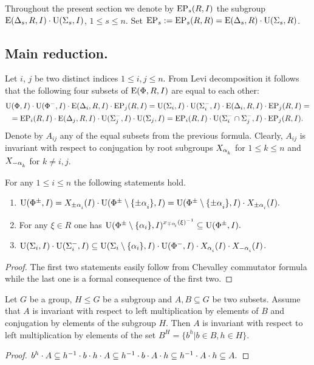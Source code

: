 Throughout the present section we denote by $\operatorname{EP}_s(R, I)$ the subgroup $\operatorname{E}(\Delta_s, R, I) \cdot \operatorname{U}(\Sigma_s, I)$, $1 \leq s \leq n$.
Set $\operatorname{EP}_s := \operatorname{EP}_s(R, R) = \operatorname{E}(\Delta_s, R) \cdot \operatorname{U}(\Sigma_s, R)$. 

\subsection{Main reduction.}
Let $i$, $j$ be two distinct indices $1\leq i,j \leq n$. From Levi decomposition it follows that the following four subsets of $\operatorname{E}(\Phi, R, I)$ are equal to each other:
\begin{multline}\nonumber \operatorname{U}(\Phi, I)\cdot \operatorname{U}(\Phi^-, I) \cdot \operatorname{E}(\Delta_i, R, I) \cdot \operatorname{EP}_j(R, I) = \operatorname{U}(\Sigma_i, I)\cdot \operatorname{U}(\Sigma^-_i, I) \cdot \operatorname{E}(\Delta_i, R, I) \cdot \operatorname{EP}_j(R, I) = \\
= \operatorname{EP}_i(R, I) \cdot \operatorname{E}(\Delta_j, R, I) \cdot \operatorname{U}(\Sigma_j^-, I)\cdot \operatorname{U}(\Sigma_j, I) = \operatorname{EP}_i(R, I) \cdot \operatorname{U}(\Sigma^-_i\cap \Sigma^-_j, I) \cdot \operatorname{EP}_j(R, I). \end{multline}
Denote by $A_{ij}$ any of the equal subsets from the previous formula. 
Clearly, $A_{ij}$ is invariant with respect to conjugation by root subgroups $X_{\alpha\ssub{k}}$ for $1\leq k\leq n$ and $X_{-\alpha\ssub{k}}$ for $k\neq i,j$.

\begin{lemma}\label{lemma:dv_unipotent} For any $1\leq i\leq n$ the following statements hold. \begin{enumerate} 
\item $\U(\Phi^\pm, I) = X_{\pm\alpha\ssub{i}}(I)\cdot \U(\Phi^\pm\setminus\{\pm\alpha\ssub{i}\}, I) = \U(\Phi^\pm\setminus\{\pm\alpha\ssub{i}\}, I)\cdot X_{\pm\alpha\ssub{i}}(I).$
\item For any $\xi\in R$ one has $\U(\Phi^\pm\setminus\{\alpha_i\}, I)^{x_{\mp\alpha\ssub{i}}(\xi)^{-1}} \subseteq \U(\Phi^\pm, I).$
\item $\U(\Sigma_i, I)\cdot \U(\Sigma^-_i, I) \subseteq \U(\Sigma_i\setminus \{\alpha_i\}, I) \cdot \U(\Phi^-, I) \cdot X_{\alpha\ssub{i}}(I) \cdot X_{-\alpha\ssub{i}}(I)$.
\end{enumerate} \end{lemma}
\begin{proof}
 The first two statements easily follow from Chevalley commutator formula while the last one is a formal consequence of the first two.
\end{proof}

\begin{lemma}\label{lemma:conj_lemma} Let $G$ be a group, $H\leq G$ be a subgroup and $A, B\subseteq G$ be two subsets.
Assume that $A$ is invariant with respect to left multiplication by elements of $B$ and conjugation by elements of the subgroup $H$.
Then $A$ is invariant with respect to left multiplication by elements of the set $B^H = \{b^h \vert b\in B, h\in H\}$. \end{lemma}
\begin{proof} $b^h \cdot A \subseteq h^{-1}\cdot b \cdot h \cdot A \subseteq h^{-1} \cdot b \cdot A \cdot h \subseteq h^{-1} \cdot A \cdot h \subseteq A. \qedhere$ \end{proof}

